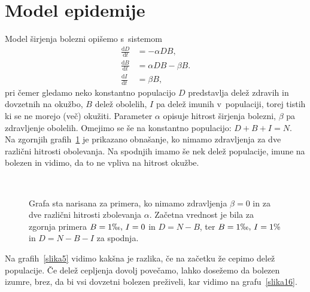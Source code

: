 \documentclass[a4paper,pdftex,10pt]{article}
\numberwithin{equation}{section} %
\numberwithin{figure}{section} %
\numberwithin{table}{section} %
\begin{document}

\pagebreak

\section{Model epidemije}
Model širjenja bolezni opišemo s~sistemom
\begin{align}\label{epidemija}
    \frac{\mathrm{d}D}{\mathrm{d}t} &= -\alpha D B, \\
    \frac{\mathrm{d}B}{\mathrm{d}t} &= \alpha D B - \beta B. \\
    \frac{\mathrm{d}I}{\mathrm{d}t} &= \beta B,
\end{align}
pri čemer gledamo neko konstantno populacijo $D$ predstavlja delež zdravih in dovzetnih na
okužbo, $B$ delež obolelih, $I$ pa delež imunih v~populaciji, torej tistih ki se ne morejo
(več) okužiti. Parameter $\alpha$ opisuje hitrost širjenja bolezni, $\beta$ pa zdravljenje
obolelih. Omejimo se še na konstantno populacijo: $D + B + I = N$.\\
Na zgornjih grafih~\ref{slika14} je prikazano obnašanje, ko nimamo zdravljenja za dve 
različni hitrosti obolevanja. Na spodnjih imamo še nek delež populacije, imune na bolezen
in vidimo, da to ne vpliva na hitrost okužbe.\\
\begin{figure}    
    \resizebox{0.48\linewidth}{!}{}
    \resizebox{0.48\linewidth}{!}{}\\
    \resizebox{0.48\linewidth}{!}{}
    \resizebox{0.48\linewidth}{!}{}
    \caption{Grafa sta narisana za primera, ko nimamo zdravljenja $\beta=0$ in za dve 
    različni hitrosti zbolevanja $\alpha$. Začetna vrednost je bila za zgornja primera
    $B=1\permil, \, I=0$ in $D=N-B$, ter $B=1\permil, \, I=1\%$ in $D=N-B-I$ za spodnja.}
    \label{slika14}
\end{figure}
Na grafih~\ref{slika5} vidimo kakšna je razlika, če na začetku že cepimo delež populacije.
Če delež cepljenja dovolj povečamo, lahko dosežemo da bolezen izumre, brez, da bi vsi 
dovzetni bolezen preživeli, kar vidimo na grafu~\ref{slika16}. \\
\end{document}
